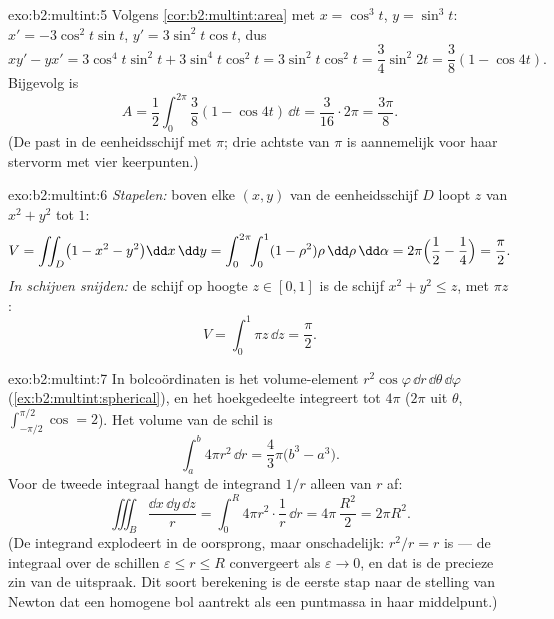 \begin{solution}{exo:b2:multint:5}
Volgens \cref{cor:b2:multint:area} met $x = \cos^3 t$, $y = \sin^3
t$: $x' = -3\cos^2 t\sin t$, $y' = 3\sin^2 t\cos t$, dus
\[
xy' - yx' = 3\cos^4 t\sin^2 t + 3\sin^4 t\cos^2 t
= 3\sin^2 t\cos^2 t = \frac{3}{4}\sin^2 2t
= \frac{3}{8}(1 - \cos 4t) .
\]
Bijgevolg is
\[
A = \frac12\int_0^{2\pi}\frac38(1 - \cos 4t)\,\dd t
= \frac{3}{16}\cdot 2\pi = \frac{3\pi}{8} .
\]
(De  past in de eenheidsschijf met  $\pi$; drie
achtste van $\pi$ is aannemelijk voor haar stervorm met vier
keerpunten.)
\end{solution}

\begin{solution}{exo:b2:multint:6}
\emph{Stapelen:} boven elke $(x, y)$ van de eenheidsschijf $D$
loopt $z$ van $x^2 + y^2$ tot $1$:
\[
V = \iint_D \bigl(1 - x^2 - y^2\bigr)\dd x\,\dd y
= \int_0^{2\pi}\!\!\int_0^1 (1 - \rho^2)\rho\,\dd\rho\,\dd\alpha
= 2\pi\Bigl(\frac12 - \frac14\Bigr) = \frac\pi2 .
\]
\emph{In schijven snijden:} de schijf op hoogte $z \in [0, 1]$ is
de schijf $x^2 + y^2 \leq z$, met  $\pi z$:
\[
V = \int_0^1 \pi z\,\dd z = \frac\pi2 .
\]
\end{solution}

\begin{solution}{exo:b2:multint:7}
In bolcoördinaten is het volume-element
$r^2\cos\varphi\,\dd r\,\dd\theta\,\dd\varphi$
(\cref{ex:b2:multint:spherical}), en het hoekgedeelte integreert
tot $4\pi$ ($2\pi$ uit $\theta$, $\int_{-\pi/2}^{\pi/2}\cos = 2$).
Het volume van de schil is
\[
\int_a^b 4\pi r^2\,\dd r = \frac43\pi\bigl(b^3 - a^3\bigr).
\]
Voor de tweede integraal hangt de integrand $1/r$ alleen van $r$
af:
\[
\iiint_B \frac{\dd x\,\dd y\,\dd z}{r}
= \int_0^R 4\pi r^2\cdot\frac1r\,\dd r
= 4\pi\,\frac{R^2}{2} = 2\pi R^2 .
\]
(De integrand explodeert in de oorsprong, maar onschadelijk:
$r^2/r = r$ is  --- de integraal over de schillen
$\varepsilon \leq r \leq R$ convergeert als $\varepsilon \to 0$, en
dat is de precieze zin van de uitspraak. Dit soort berekening is de
eerste stap naar de stelling van Newton dat een homogene bol
aantrekt als een puntmassa in haar middelpunt.)
\end{solution}

